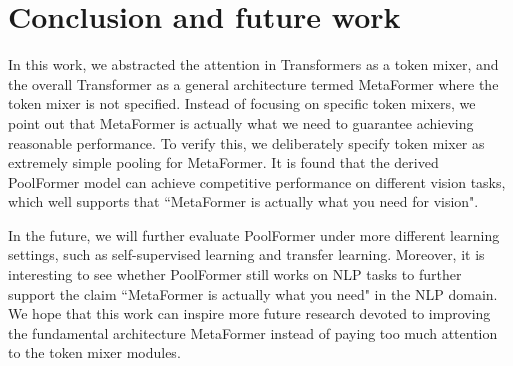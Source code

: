 \section{Conclusion and future work}
In this work, we abstracted the attention in Transformers as a token mixer, and the overall Transformer as a general architecture termed MetaFormer where the token mixer is not specified. Instead of focusing on specific token mixers, we point out that MetaFormer is actually what we need to guarantee achieving reasonable performance. To verify this, we deliberately specify token mixer as extremely simple pooling for MetaFormer. It is found that the derived PoolFormer model can achieve competitive performance on different vision tasks, which well supports that ``MetaFormer is actually what you need for vision". 

In the future, we will further evaluate PoolFormer under more different learning settings, such as self-supervised learning and transfer learning. Moreover, it is interesting to see whether PoolFormer still works on NLP tasks to further support the claim ``MetaFormer is actually what you need" in the NLP domain. We hope that this work can inspire more future research devoted to improving the fundamental architecture MetaFormer instead of paying too much attention to the token mixer modules. 